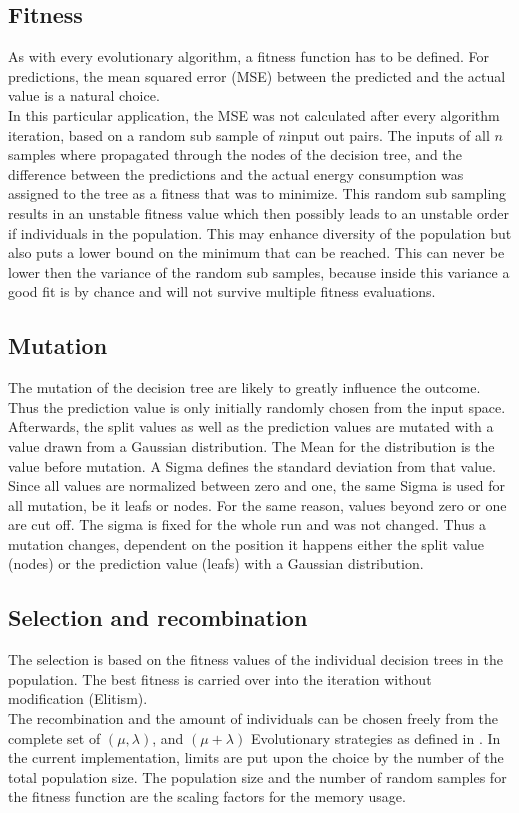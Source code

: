 \documentclass[conference]{IEEEtran}
\begin{document}
\subsection{Fitness}
As with every evolutionary algorithm, a fitness function has to be defined. For predictions, the mean squared error (MSE) between the predicted and the actual value is a natural choice. \\
In this particular application, the MSE was not calculated after every algorithm iteration, based on a random sub sample of $ n $input out pairs. The inputs of all $n$ samples where propagated through the nodes of the decision tree, and the difference between the predictions and the actual energy consumption was assigned to the tree as a fitness that was to minimize. This random  sub sampling results in an unstable fitness value which then possibly leads to an unstable order if individuals in the population. This may enhance diversity of the population but also puts a lower bound on the minimum that can be reached. This can never be lower then the variance of the random sub samples, because inside this variance a good fit is by chance and will not survive multiple fitness evaluations.

\subsection{Mutation}
The mutation of the decision tree are likely to greatly influence the outcome. Thus the prediction value is only initially randomly chosen from the input space. Afterwards, the split values as well as the prediction values are mutated with a value drawn from a Gaussian distribution. The Mean for the distribution is the value before mutation. A Sigma defines the standard deviation from that value. Since all values are normalized between zero and one, the same Sigma is used for all mutation, be it leafs or nodes. For the same reason, values beyond zero or one are cut off. The sigma is fixed for the whole run and was not changed. Thus a mutation changes, dependent on the position it happens either the split value (nodes) or the prediction value (leafs) with a Gaussian distribution.

\subsection{Selection and recombination}
The selection is based on the fitness values of the individual decision trees in the population. The best fitness is carried over into the iteration without modification (Elitism).\\
The recombination and the amount of individuals can be chosen freely from the complete set of $(\mu ,\lambda)$, and $(\mu + \lambda)$ Evolutionary strategies as defined in \cite{rozenberg2011handbook}. In the current implementation, limits are put upon the choice by the number of the total population size. The population size and the number of random samples for the fitness function are the scaling factors for the memory usage. 
\end{document}

